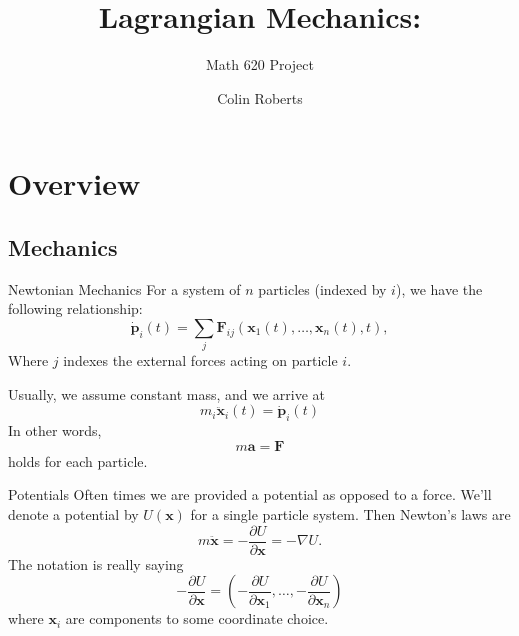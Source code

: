 \documentclass[usenames,dvipsnames]{beamer}
\title{Lagrangian Mechanics:}
\subtitle{Math 620 Project}
\author{Colin Roberts}
\theoremstyle{definition}
\theoremstyle{theorem}
\begin{document}
{
\begin{frame}
\titlepage
\end{frame}
}


\section{Overview}
    
    
    \subsection{Mechanics}
    
        \begin{frame}{Newtonian Mechanics}
            For a system of $n$ particles (indexed by $i$), we have the following relationship:
                \[
                \dot{\mathbf{p}}_i(t)=\sum_{j}\mathbf{F}_{ij}(\mathbf{x}_1(t),\dots,\mathbf{x}_n(t),t),
                \]
            Where $j$ indexes the external forces acting on particle $i$.
            
            Usually, we assume constant mass, and we arrive at
                \[
                m_i \mathbf{\ddot{x}}_i(t)= \dot{\mathbf{p}}_i(t)
                \]
            In other words,
                \[
                m\mathbf{a}=\mathbf{F}
                \]
            holds for each particle.
        \end{frame}
        
        \begin{frame}{Potentials}
            Often times we are provided a potential as opposed to a force.  We'll denote a potential by $U(\mathbf{x})$ for a single particle system. Then Newton's laws are
            \[
            m\ddot{\mathbf{x}}=-\frac{\partial U}{\partial \mathbf{x}}=-\nabla U.
            \]
            The notation is really saying
            \[
            -\frac{\partial U}{\partial \mathbf{x}}=
            \left( -\frac{\partial U}{\partial \mathbf{x}_1},\dots,-\frac{\partial U}{\partial \mathbf{x}_n}\right)
            \]
            where $\mathbf{x}_i$ are components to some coordinate choice.
            
        \end{frame}
        
\end{document}
